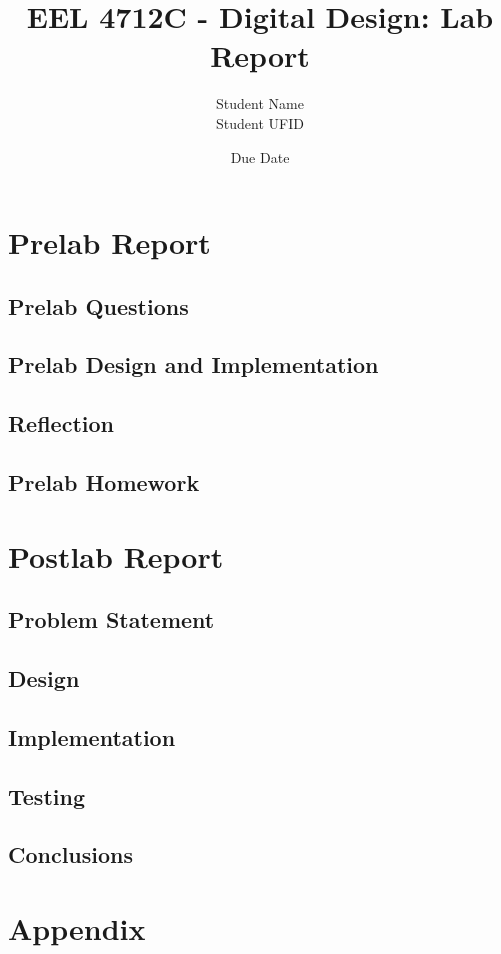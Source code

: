 \documentclass{article}
\title{EEL 4712C - Digital Design: Lab Report}
\author{Student Name \\ Student UFID}
\date{Due Date}
\begin{document}
\maketitle

\section*{Prelab Report}

\subsection*{Prelab Questions}

\subsection*{Prelab Design and Implementation}

\subsection*{Reflection}

\subsection*{Prelab Homework}

\section*{Postlab Report}

\subsection*{Problem Statement}

\subsection*{Design}

\subsection*{Implementation}

\subsection*{Testing}

\subsection*{Conclusions}

\section*{Appendix}
\end{document}
